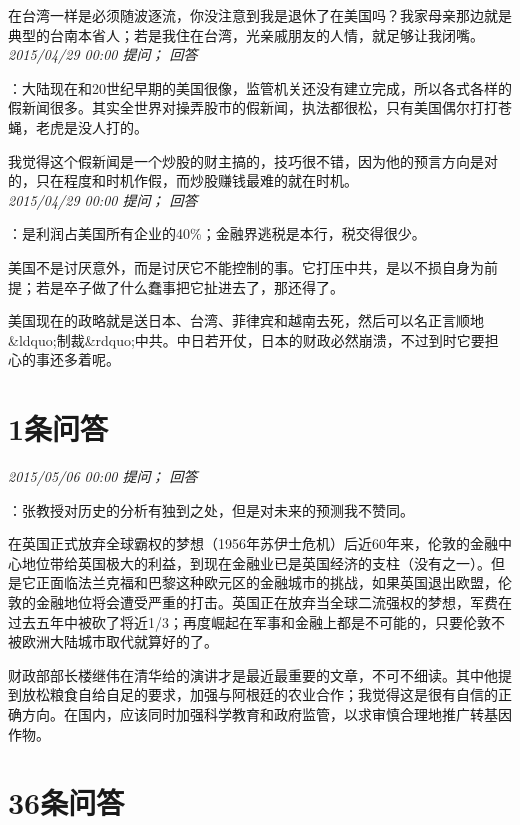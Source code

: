 \documentclass[twocolumn]{ctexart}
\begin{document}
在台湾一样是必须随波逐流，你没注意到我是退休了在美国吗？我家母亲那边就是典型的台南本省人；若是我住在台湾，光亲戚朋友的人情，就足够让我闭嘴。\\

\textit{\hfill\noindent\small 2015/04/29 00:00 提问； 回答}

：大陆现在和20世纪早期的美国很像，监管机关还没有建立完成，所以各式各样的假新闻很多。其实全世界对操弄股市的假新闻，执法都很松，只有美国偶尔打打苍蝇，老虎是没人打的。

我觉得这个假新闻是一个炒股的财主搞的，技巧很不错，因为他的预言方向是对的，只在程度和时机作假，而炒股赚钱最难的就在时机。\\

\textit{\hfill\noindent\small 2015/04/29 00:00 提问； 回答}

：是利润占美国所有企业的40\%；金融界逃税是本行，税交得很少。

美国不是讨厌意外，而是讨厌它不能控制的事。它打压中共，是以不损自身为前提；若是卒子做了什么蠢事把它扯进去了，那还得了。

美国现在的政略就是送日本、台湾、菲律宾和越南去死，然后可以名正言顺地\&ldquo;制裁\&rdquo;中共。中日若开仗，日本的财政必然崩溃，不过到时它要担心的事还多着呢。\\

\section{1条问答}

\textit{\hfill\noindent\small 2015/05/06 00:00 提问； 回答}

：张教授对历史的分析有独到之处，但是对未来的预测我不赞同。

在英国正式放弃全球霸权的梦想（1956年苏伊士危机）后近60年来，伦敦的金融中心地位带给英国极大的利益，到现在金融业已是英国经济的支柱（没有之一）。但是它正面临法兰克福和巴黎这种欧元区的金融城市的挑战，如果英国退出欧盟，伦敦的金融地位将会遭受严重的打击。英国正在放弃当全球二流强权的梦想，军费在过去五年中被砍了将近1/3；再度崛起在军事和金融上都是不可能的，只要伦敦不被欧洲大陆城市取代就算好的了。

财政部部长楼继伟在清华给的演讲才是最近最重要的文章，不可不细读。其中他提到放松粮食自给自足的要求，加强与阿根廷的农业合作；我觉得这是很有自信的正确方向。在国内，应该同时加强科学教育和政府监管，以求审慎合理地推广转基因作物。
\\

\section{36条问答}
\end{document}
